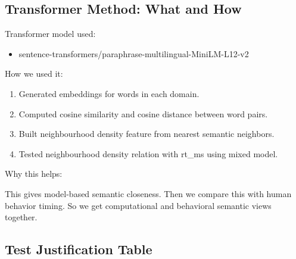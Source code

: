 \subsection{Transformer Method: What and
How}\label{transformer-method-what-and-how}

Transformer model used:

\begin{itemize}
\tightlist
\item
  sentence-transformers/paraphrase-multilingual-MiniLM-L12-v2
\end{itemize}

How we used it:

\begin{enumerate}
\def\labelenumi{\arabic{enumi}.}
\tightlist
\item
  Generated embeddings for words in each domain.
\item
  Computed cosine similarity and cosine distance between word pairs.
\item
  Built neighbourhood density feature from nearest semantic neighbors.
\item
  Tested neighbourhood density relation with rt\_ms using mixed model.
\end{enumerate}

Why this helps:

This gives model-based semantic closeness. Then we compare this with
human behavior timing. So we get computational and behavioral semantic
views together.

\subsection{Test Justification Table}\label{test-justification-table}

